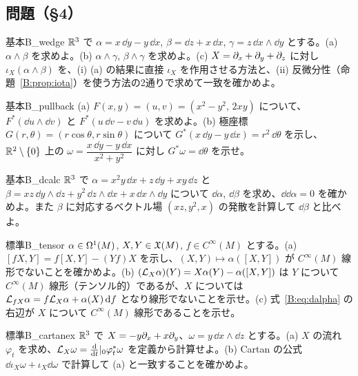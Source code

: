 \subsection*{問題（§4）}

\begin{probl}{基本}{B_wedge}
$\mathbb R^3$ で $\alpha=x\,\dd y-y\,\dd x$, $\beta=\dd z+x\,\dd x$, $\gamma=z\,\dd x\wedge\dd y$ とする。(a) $\alpha\wedge\beta$ を求めよ。(b) $\alpha\wedge\gamma$, $\beta\wedge\gamma$ を求めよ。(c) $X=\partial_x+\partial_y+\partial_z$ に対し $\iota_X(\alpha\wedge\beta)$ を、(i) (a) の結果に直接 $\iota_X$ を作用させる方法と、(ii) 反微分性（命題~\ref{B:prop:iota}）を使う方法の2通りで求めて一致を確かめよ。
\end{probl}

\begin{probl}{基本}{B_pullback}
(a) $F(x,y)=(u,v)=(x^2-y^2,\,2xy)$ について、$F^*(\dd u\wedge\dd v)$ と $F^*(u\,\dd v-v\,\dd u)$ を求めよ。(b) 極座標 $G(r,\theta)=(r\cos\theta,r\sin\theta)$ について $G^*(x\,\dd y-y\,\dd x)=r^2\,\dd\theta$ を示し、$\mathbb R^2\setminus\{0\}$ 上の $\omega=\dfrac{x\,\dd y-y\,\dd x}{x^2+y^2}$ に対し $G^*\omega=\dd\theta$ を示せ。
\end{probl}

\begin{probl}{基本}{B_dcalc}
$\mathbb R^3$ で $\alpha=x^2y\,\dd x+z\,\dd y+xy\,\dd z$ と $\beta=xz\,\dd y\wedge\dd z+y^2\,\dd z\wedge\dd x+x\,\dd x\wedge\dd y$ について $\dd\alpha$, $\dd\beta$ を求め、$\dd\dd\alpha=0$ を確かめよ。また $\beta$ に対応するベクトル場 $(xz,y^2,x)$ の発散を計算して $\dd\beta$ と比べよ。
\end{probl}


\begin{probl}{標準}{B_tensor}
$\alpha\in\Omega^1(M)$, $X,Y\in\mathfrak X(M)$, $f\in C^\infty(M)$ とする。(a) $[fX,Y]=f[X,Y]-(Yf)X$ を示し、$(X,Y)\mapsto\alpha([X,Y])$ が $C^\infty(M)$ 線形でないことを確かめよ。(b) $(\mathcal L_X\alpha)(Y)=X\alpha(Y)-\alpha([X,Y])$ は $Y$ について $C^\infty(M)$ 線形（テンソル的）であるが、$X$ については $\mathcal L_{fX}\alpha=f\mathcal L_X\alpha+\alpha(X)\,\mathrm{d} f$ となり線形でないことを示せ。(c) 式~\eqref{B:eq:dalpha} の右辺が $X$ について $C^\infty(M)$ 線形であることを示せ。
\end{probl}

\begin{probl}{標準}{B_cartanex}
$\mathbb R^3$ で $X=-y\partial_x+x\partial_y$、$\omega=y\,\dd x\wedge\dd z$ とする。(a) $X$ の流れ $\varphi_t$ を求め、$\mathcal L_X\omega=\frac{\mathrm{d}}{\mathrm{d} t}|_0\varphi_t^*\omega$ を定義から計算せよ。(b) Cartan の公式 $\dd\iota_X\omega+\iota_X\dd\omega$ で計算して (a) と一致することを確かめよ。
\end{probl}


